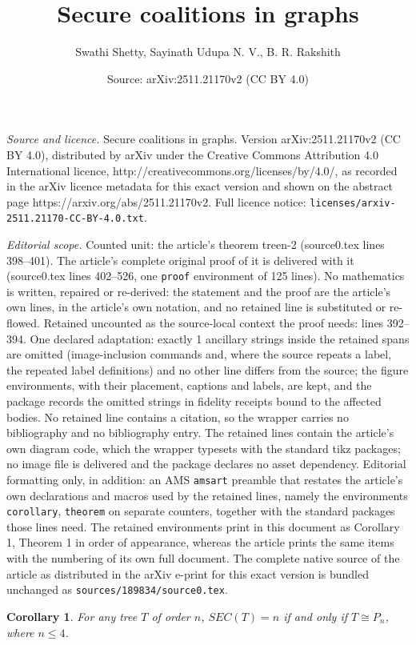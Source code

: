 \documentclass[10pt,a4paper]{amsart}
\title{Secure coalitions in graphs}
\author{Swathi Shetty, Sayinath Udupa N. V., B. R. Rakshith}
\date{Source: arXiv:2511.21170v2 (CC BY 4.0)}
\newtheorem{corollary}{Corollary}
\begin{document}
\maketitle

\noindent\emph{Source and licence.} Secure coalitions in graphs. Version arXiv:2511.21170v2 (CC BY 4.0), distributed by arXiv under the Creative Commons Attribution 4.0 International licence, http://creativecommons.org/licenses/by/4.0/, as recorded in the arXiv licence metadata for this exact version and shown on the abstract page https://arxiv.org/abs/2511.21170v2. Full licence notice: \texttt{licenses/arxiv-2511.21170-CC-BY-4.0.txt}.\par\smallskip

\noindent\textit{Editorial scope.} Counted unit: the article's theorem treen-2 (source0.tex lines 398--401). The article's complete original proof of it is delivered with it (source0.tex lines 402--526, one \texttt{proof} environment of 125 lines). No mathematics is written, repaired or re-derived: the statement and the proof are the article's own lines, in the article's own notation, and no retained line is substituted or re-flowed.  Retained uncounted as the source-local context the proof needs: lines 392--394.  One declared adaptation: exactly 1 ancillary strings inside the retained spans are omitted (image-inclusion commands and, where the source repeats a label, the repeated label definitions) and no other line differs from the source; the figure environments, with their placement, captions and labels, are kept, and the package records the omitted strings in fidelity receipts bound to the affected bodies.  No retained line contains a citation, so the wrapper carries no bibliography and no bibliography entry.  The retained lines contain the article's own diagram code, which the wrapper typesets with the standard tikz packages; no image file is delivered and the package declares no asset dependency.  Editorial formatting only, in addition: an AMS \texttt{amsart} preamble that restates the article's own declarations and macros used by the retained lines, namely the environments \texttt{corollary}, \texttt{theorem} on separate counters, together with the standard packages those lines need.  The retained environments print in this document as Corollary 1, Theorem 1 in order of appearance, whereas the article prints the same items with the numbering of its own full document.  The complete native source of the article as distributed in the arXiv e-print for this exact version is bundled unchanged as \texttt{sources/189834/source0.tex}.
\begin{corollary}\label{nsecnumber1}
For any tree $T$ of order $n$, $SEC(T)=n$ if and only if $T\cong P_n$, where $n\le 4$.
\end{corollary}
\end{document}
